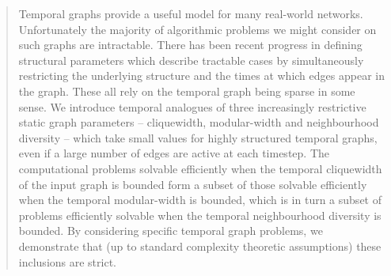 \documentclass[preprint,12pt]{elsarticle}
\begin{document}
\begin{frontmatter}
\begin{abstract}
Temporal graphs provide a useful model for many real-world networks. Unfortunately the majority of algorithmic problems we might consider on such graphs are intractable.  There has been recent progress in defining structural parameters which describe tractable cases by simultaneously restricting the underlying structure and the times at which edges appear in the graph.  These all rely on the temporal graph being sparse in some sense.  We introduce temporal analogues of three increasingly restrictive static graph parameters -- cliquewidth, modular-width and neighbourhood diversity -- which take small values for highly structured temporal graphs, even if a large number of edges are active at each timestep.  The computational problems solvable efficiently when the temporal cliquewidth of the input graph is bounded form a subset of those solvable efficiently when the temporal modular-width is bounded, which is in turn a subset of problems efficiently solvable when the temporal neighbourhood diversity is bounded.  By considering specific temporal graph problems, we demonstrate that (up to standard complexity theoretic assumptions) these inclusions are strict.
\end{abstract}




\end{frontmatter}
\end{document}
